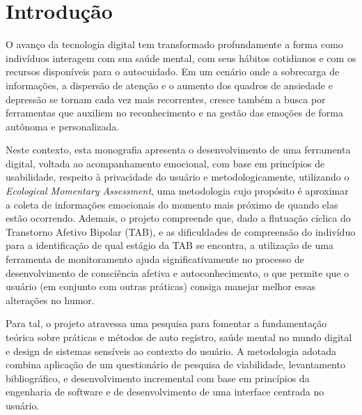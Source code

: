 \chapter{Introdução}

O avanço da tecnologia digital tem transformado profundamente a forma como
indivíduos interagem com sua saúde mental, com seus hábitos cotidianos e com os
recursos disponíveis para o autocuidado. Em um cenário onde a sobrecarga de
informações, a dispersão de atenção e o aumento dos quadros de ansiedade e
depressão se tornam cada vez mais recorrentes, cresce também a busca por
ferramentas que auxiliem no reconhecimento e na gestão das emoções de forma
autônoma e personalizada.

Neste contexto, esta monografia apresenta o desenvolvimento de uma ferramenta
digital, voltada ao acompanhamento emocional, com base em princípios de
usabilidade, respeito à privacidade do usuário e metodologicamente, utilizando
o \textit{Ecological Momentary Assessment}, uma metodologia cujo propósito é
aproximar a coleta de informações emocionais do momento mais próximo de quando
elas estão ocorrendo. Ademais, o projeto compreende que, dado a flutuação
cíclica do Transtorno Afetivo Bipolar (TAB), e as dificuldades de compreensão
do indivíduo para a identificação de qual estágio da TAB se encontra, a
utilização de uma ferramenta de monitoramento ajuda significativamente no
processo de desenvolvimento de consciência afetiva e autoconhecimento, o que
permite que o usuário (em conjunto com outras práticas) consiga manejar melhor
essas alterações no humor.

Para tal, o projeto atravessa uma pesquisa para fomentar a fundamentação
teórica sobre práticas e métodos de auto registro, saúde mental no mundo
digital e design de sistemas sensíveis ao contexto do usuário. A metodologia
adotada combina aplicação de um questionário de pesquisa de viabilidade,
levantamento bibliográfico, e desenvolvimento incremental com base em
princípios da engenharia de software e de desenvolvimento de uma interface
centrada no usuário.
